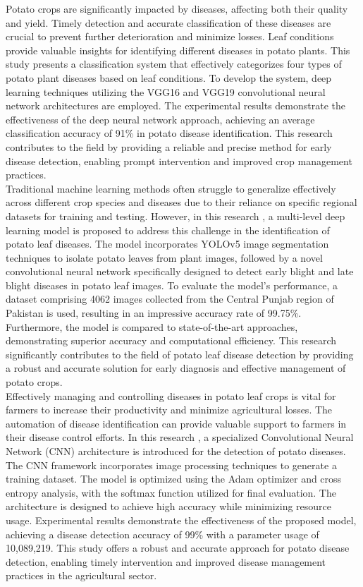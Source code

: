 \documentclass[conference]{IEEEtran}
\begin{document}
Potato crops are significantly impacted by diseases, affecting both their quality and yield. Timely detection and accurate classification of these diseases are crucial to prevent further deterioration and minimize losses. Leaf conditions provide valuable insights for identifying different diseases in potato plants. This study \cite{9231784} presents a classification system that effectively categorizes four types of potato plant diseases based on leaf conditions. To develop the system, deep learning techniques utilizing the VGG16 and VGG19 convolutional neural network architectures are employed. The experimental results demonstrate the effectiveness of the deep neural network approach, achieving an average classification accuracy of 91\% in potato disease identification. This research contributes to the field by providing a reliable and precise method for early disease detection, enabling prompt intervention and improved crop management practices.\\

Traditional machine learning methods often struggle to generalize effectively across different crop species and diseases due to their reliance on specific regional datasets for training and testing. However, in this research \cite{electronics10172064}, a multi-level deep learning model is proposed to address this challenge in the identification of potato leaf diseases. The model incorporates YOLOv5 image segmentation techniques to isolate potato leaves from plant images, followed by a novel convolutional neural network specifically designed to detect early blight and late blight diseases in potato leaf images. To evaluate the model's performance, a dataset comprising 4062 images collected from the Central Punjab region of Pakistan is used, resulting in an impressive accuracy rate of 99.75\%. Furthermore, the model is compared to state-of-the-art approaches, demonstrating superior accuracy and computational efficiency. This research significantly contributes to the field of potato leaf disease detection by providing a robust and accurate solution for early diagnosis and effective management of potato crops.\\

Effectively managing and controlling diseases in potato leaf crops is vital for farmers to increase their productivity and minimize agricultural losses. The automation of disease identification can provide valuable support to farmers in their disease control efforts. In this research \cite{9181312}, a specialized Convolutional Neural Network (CNN) architecture is introduced for the detection of potato diseases. The CNN framework incorporates image processing techniques to generate a training dataset. The model is optimized using the Adam optimizer and cross entropy analysis, with the softmax function utilized for final evaluation. The architecture is designed to achieve high accuracy while minimizing resource usage. Experimental results demonstrate the effectiveness of the proposed model, achieving a disease detection accuracy of 99\% with a parameter usage of 10,089,219. This study offers a robust and accurate approach for potato disease detection, enabling timely intervention and improved disease management practices in the agricultural sector.\\
\end{document}
